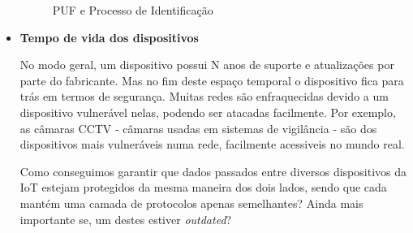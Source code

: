 \documentclass{llncs}
\begin{document}
\begin{itemize}
        \begin{figure}
            \centering
            \qquad
            \qquad
            \qquad
            \caption{PUF e Processo de Identificação}
        \end{figure}

    \item \textbf{Tempo de vida dos dispositivos}
        
        No modo geral, um dispositivo possui N anos de suporte e atualizações por parte do fabricante. Mas no fim deste espaço temporal o dispositivo fica para trás em termos de segurança. Muitas redes são enfraquecidas devido a um dispositivo vulnerável nelas, podendo ser atacadas facilmente. Por exemplo, as câmaras CCTV - câmaras usadas em sistemas de vigilância - são dos dispositivos mais vulneráveis numa rede, facilmente acessiveis no mundo real.\par
        Como conseguimos garantir que dados passados entre diversos dispositivos da IoT estejam protegidos da mesma maneira dos dois lados, sendo que cada mantém uma camada de protocolos apenas semelhantes? Ainda mais importante se, um destes estiver \textit{outdated}?
        

\end{itemize}
\end{document}

